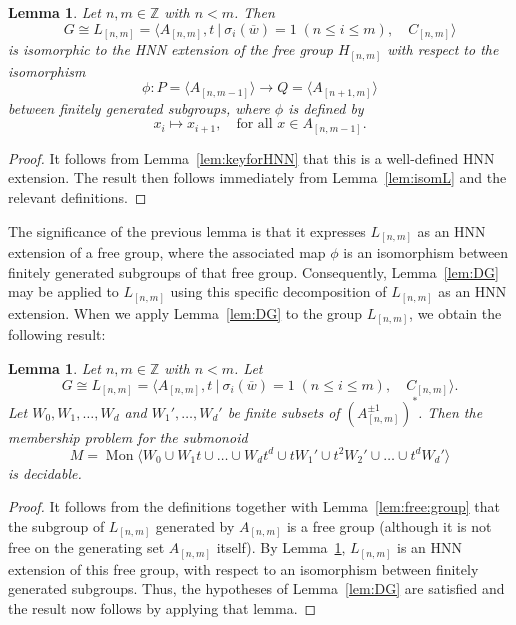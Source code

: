 \documentclass[11pt]{amsart}
\newcommand{\Mgen}[1]{\operatorname{Mon}\bigl\langle #1 \bigr\rangle}
\newcommand{\Ggen}[1]{\bigl\langle #1 \bigr\rangle}
\newcommand{\Gpres}[2]{\bigl\langle #1\:|\:#2 \bigr\rangle}
\theoremstyle{plain}
\newtheorem{lemma}[theorem]{Lemma}
\theoremstyle{definition}
\begin{document}
\begin{lemma}\label{lem:BigHNNExtension} 
Let $n, m \in \mathbb{Z}$ with $n < m$. Then
\[
G \cong L_{[n,m]}   
= \Gpres{A_{[n,m]}, t }{\sigma_i(\overline{w}) = 1 \; (n \leq i \leq m), \quad C_{[n,m]}}
\]
is isomorphic to the HNN extension of the free group $H_{[n,m]}$ with respect to the isomorphism
\[
\phi: P = \Ggen{A_{[n,m-1]}} \rightarrow Q = \Ggen{A_{[n+1,m]}}
\]
between finitely generated subgroups, where $\phi$ is defined by
\[
x_i \mapsto x_{i+1}, \quad \text{for all } x \in A_{[n,m-1]}.
\]
\end{lemma}


\begin{proof}
It follows from Lemma~\ref{lem:keyforHNN} that this is a well-defined HNN extension. The result then follows immediately from Lemma~\ref{lem:isomL} and the relevant definitions.
\end{proof}



The significance of the previous lemma is that it expresses $L_{[n,m]}$ as an HNN extension of a free group, where the associated map $\phi$ is an isomorphism between finitely generated subgroups of that free group. Consequently, Lemma~\ref{lem:DG} may be applied to $L_{[n,m]}$ using this specific decomposition of $L_{[n,m]}$ as an HNN extension. When we apply Lemma~\ref{lem:DG} to the group $L_{[n,m]}$, we obtain the following result:

\begin{lemma}\label{lem:TheGoodOne:General}
Let $n, m \in \mathbb{Z}$ with $n < m$. Let
\[
G \cong L_{[n,m]}   
= \Gpres{A_{[n,m]}, t }{\sigma_i(\overline{w}) = 1 \; (n \leq i \leq m), \quad C_{[n,m]}}.
\]
Let $W_0, W_1, \ldots, W_d$ and $W_1', \ldots, W_d'$ be finite 
subsets of $(A_{[n,m]}^{\pm 1})^\ast$.
Then the membership problem for the submonoid
\[
M = \Mgen{W_0 \cup W_1 t \cup \ldots \cup W_d t^d \cup t W_1' \cup t^2 W_2' \cup \ldots \cup t^d W_d'}
\]
is decidable.
\end{lemma}
\begin{proof}
It follows from the definitions together with Lemma~\ref{lem:free:group} that the subgroup of $L_{[n,m]}$ generated by $A_{[n,m]}$ is a free group (although it is not free on the generating set $A_{[n,m]}$ itself). By Lemma~\ref{lem:BigHNNExtension}, $L_{[n,m]}$ is an HNN extension of this free group, with respect to an isomorphism between finitely generated subgroups. Thus, the hypotheses of Lemma~\ref{lem:DG} are satisfied and the result now follows by applying that lemma. 
\end{proof}
\end{document}
